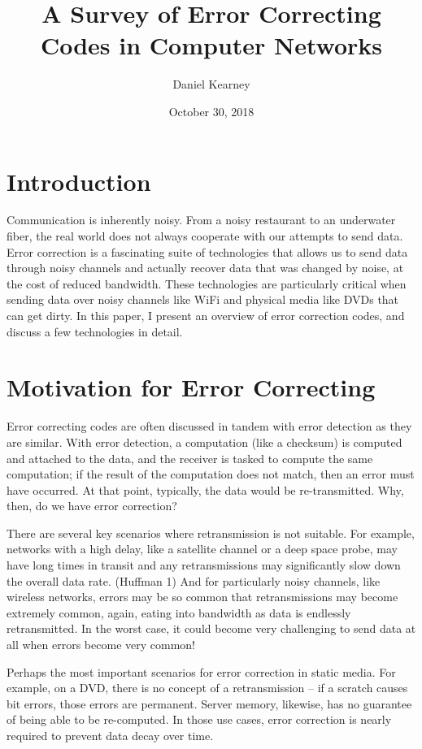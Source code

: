 \documentclass[12pt]{article}
\title{A Survey of Error Correcting Codes in Computer Networks}
\author{Daniel Kearney}
\date{October 30, 2018}
\begin{document}
\maketitle

\section{Introduction}

Communication is inherently noisy. From a noisy restaurant to an underwater fiber, the real world does not always cooperate with our attempts to send data. Error correction is a fascinating suite of technologies that allows us to send data through noisy channels and actually recover data that was changed by noise, at the cost of reduced bandwidth. These technologies are particularly critical when sending data over noisy channels like WiFi and physical media like DVDs that can get dirty. In this paper, I present an overview of error correction codes, and discuss a few technologies in detail.

\section{Motivation for Error Correcting}

Error correcting codes are often discussed in tandem with error detection as they are similar. With error detection, a computation (like a checksum) is computed and attached to the data, and the receiver is tasked to compute the same computation; if the result of the computation does not match, then an error must have occurred. At that point, typically, the data would be re-transmitted. Why, then, do we have error correction?

There are several key scenarios where retransmission is not suitable. For example, networks with a high delay, like a satellite channel or a deep space probe, may have long times in transit and any retransmissions may significantly slow down the overall data rate. (Huffman 1) And for particularly noisy channels, like wireless networks, errors may be so common that retransmissions may become extremely common, again, eating into bandwidth as data is endlessly retransmitted. In the worst case, it could become very challenging to send data at all when errors become very common!

Perhaps the most important scenarios for error correction in static media. For example, on a DVD, there is no concept of a retransmission -- if a scratch causes bit errors, those errors are permanent. Server memory, likewise, has no guarantee of being able to be re-computed. In those use cases, error correction is nearly required to prevent data decay over time. \cite{pless}
\end{document}
